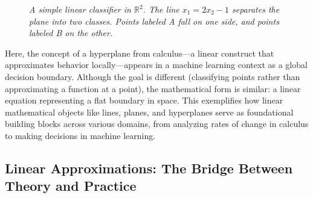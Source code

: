 \begin{figure}[H]
\centering
{}
\caption{\textit{A simple linear classifier in $\mathbb{R}^2$. The line $x_1 = 2x_2 - 1$ separates the plane into two classes. Points labeled A fall on one side, and points labeled B on the other.}}
\end{figure}

\noindent Here, the concept of a hyperplane from calculus—a linear construct that approximates behavior locally—appears in a machine learning context as a global decision boundary. Although the goal is different (classifying points rather than approximating a function at a point), the mathematical form is similar: a linear equation representing a flat boundary in space. This exemplifies how linear mathematical objects like lines, planes, and hyperplanes serve as foundational building blocks across various domains, from analyzing rates of change in calculus to making decisions in machine learning.


\subsection*{Linear Approximations: The Bridge Between Theory and Practice} 

